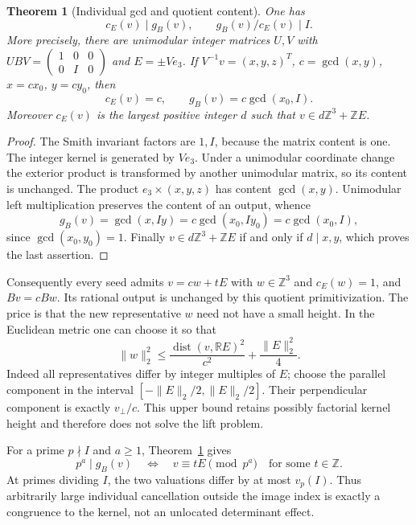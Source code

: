 \documentclass[11pt,a4paper]{article}
\newtheorem{theorem}{Theorem}[section]
\theoremstyle{definition}
\theoremstyle{remark}
\numberwithin{equation}{section}
\begin{document}
\begin{theorem}[Individual gcd and quotient content]
\label{p6:thm:seed-content}
One has
\begin{equation}\label{p6:eq:seed-content}
 c_E(v)\mid g_B(v),\qquad g_B(v)/c_E(v)\mid I.
\end{equation}
More precisely, there are unimodular integer matrices $U,V$ with
$UBV=\left(\begin{smallmatrix}1&0&0\\0&I&0\end{smallmatrix}\right)$
and $E=\pm Ve_3$. If $V^{-1}v=(x,y,z)^T$, $c=\gcd(x,y)$,
$x=cx_0$, $y=cy_0$, then
\[
 c_E(v)=c,\qquad g_B(v)=c\gcd(x_0,I).
\]
Moreover $c_E(v)$ is the largest positive integer $d$ such that
$v\in d\mathbb Z^3+\mathbb ZE$.
\end{theorem}
\begin{proof}
The Smith invariant factors are $1,I$, because the matrix content is one.
The integer kernel is generated by $Ve_3$. Under a unimodular coordinate
change the exterior product is transformed by another unimodular matrix,
so its content is unchanged. The product $e_3\times(x,y,z)$ has content
$\gcd(x,y)$. Unimodular left multiplication preserves the content of an
output, whence
\[
 g_B(v)=\gcd(x,Iy)=c\gcd(x_0,Iy_0)=c\gcd(x_0,I),
\]
since $\gcd(x_0,y_0)=1$. Finally $v\in d\mathbb Z^3+\mathbb ZE$
if and only if $d\mid x,y$, which proves the last assertion.
\end{proof}

Consequently every seed admits $v=cw+tE$ with $w\in\mathbb Z^3$ and
$c_E(w)=1$, and $Bv=cBw$. Its rational output is unchanged by this
quotient primitivization. The price is that the new representative $w$
need not have a small height. In the Euclidean metric one can choose it so
that
\begin{equation}\label{p6:eq:lift-height}
 \|w\|_2^2\le
 \frac{\operatorname{dist}(v,\mathbb RE)^2}{c^2}
       +\frac{\|E\|_2^2}{4}.
\end{equation}
Indeed all representatives differ by integer multiples of $E$; choose the
parallel component in the interval $[-\|E\|_2/2,\|E\|_2/2]$. Their
perpendicular component is exactly $v_\perp/c$. This upper bound retains
possibly factorial kernel height and therefore does not solve the lift
problem.

For a prime $p\nmid I$ and $a\ge1$, Theorem~\ref{p6:thm:seed-content} gives
\begin{equation}\label{p6:eq:seed-local}
 p^a\mid g_B(v)\quad\Longleftrightarrow\quad
 v\equiv tE\pmod {p^a}\quad\text{for some }t\in\mathbb Z.
\end{equation}
At primes dividing $I$, the two valuations differ by at most $v_p(I)$.
Thus arbitrarily large individual cancellation outside the image index
is exactly a congruence to the kernel, not an unlocated determinant effect.
\end{document}
